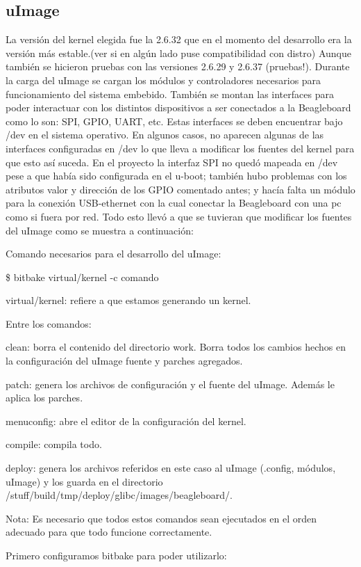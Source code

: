 \subsection{uImage}
La versión del kernel elegida fue la 2.6.32 que en el momento del desarrollo era la versión más estable.(ver si en algún lado puse compatibilidad con distro) Aunque también se hicieron pruebas con las versiones 2.6.29 y 2.6.37 (pruebas!).
Durante la carga del uImage se cargan los módulos y controladores necesarios para funcionamiento del sistema embebido. También se montan las interfaces para poder interactuar con los distintos dispositivos a ser conectados a la Beagleboard como lo son: SPI, GPIO, UART, etc. Estas interfaces se deben encuentrar bajo /dev en el sistema operativo. En algunos casos, no aparecen algunas de las interfaces configuradas en /dev lo que lleva a modificar los fuentes del kernel para que esto así suceda. En el proyecto la interfaz SPI no quedó mapeada en /dev pese a que había sido configurada en el u-boot; también hubo problemas con los atributos valor y dirección de los GPIO comentado antes; y hacía falta un módulo para la conexión USB-ethernet con la cual conectar la Beagleboard con una pc como si fuera por red. Todo esto llevó a que se tuvieran que modificar los fuentes del uImage como se muestra a continuación:
 
Comando necesarios para el desarrollo del uImage:

\$ bitbake virtual/kernel -c comando

virtual/kernel: refiere a que estamos generando un kernel.

Entre los comandos:

clean: borra el contenido del directorio work. Borra todos los cambios hechos en la configuración del uImage fuente y parches agregados.

patch: genera los archivos de configuración y el fuente del uImage. Además le aplica los parches.

menuconfig: abre el editor de la configuración del kernel.

compile: compila todo.

deploy: genera los archivos referidos en este caso al uImage (.config, módulos, uImage) y los guarda en el directorio /stuff/build/tmp/deploy/glibc/images/beagleboard/.

Nota: Es necesario que todos estos comandos sean ejecutados en el orden adecuado para que todo funcione correctamente.

Primero configuramos bitbake para poder utilizarlo:


